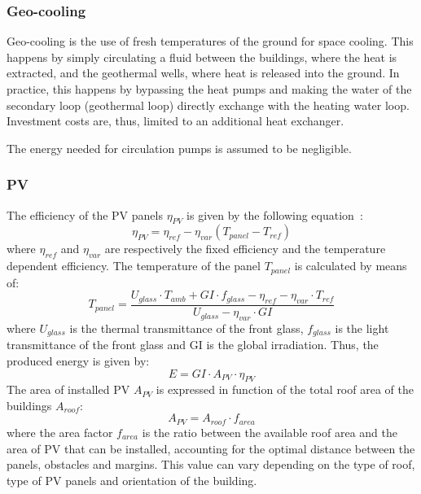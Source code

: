 \documentclass{article}
\begin{document}
\subsubsection{Geo-cooling}
Geo-cooling is the use of fresh temperatures of the ground for space cooling. This happens by simply circulating a fluid between the buildings, where the heat is extracted, and the geothermal wells, where heat is released into the ground. In practice, this happens by bypassing the heat pumps and making the water of the secondary loop (geothermal loop) directly exchange with the heating water loop. Investment costs are, thus, limited to an additional heat exchanger. 

The energy needed for circulation pumps is assumed to be negligible. 


\subsubsection{PV}\label{sss:pv}
The efficiency of the PV panels $\eta_{PV}$ is given by the following equation~\cite{stadlerModelbasedOptimizationDistributed2016}:
\begin{equation}
	\eta_{PV} = \eta_{ref} - \eta_{var} (T_{panel}-T_{ref})
\end{equation}
where $\eta_{ref}$ and $\eta_{var}$ are respectively the fixed efficiency and the temperature dependent efficiency. The temperature of the panel $T_{panel}$ is calculated by means of:
\begin{equation}
	T_{panel} = \frac{U_{glass}\cdot T_{amb} + GI \cdot f_{glass}-\eta_{ref} - \eta_{var} \cdot T_{ref}}{U_{glass}-\eta_{var} \cdot GI}
\end{equation}
where $U_{glass}$ is the thermal transmittance of the front glass, $f_{glass}$ is the light transmittance of the front glass and GI is the global irradiation.
Thus, the produced energy is given by:
\begin{equation}
	E = GI \cdot A_{PV} \cdot  \eta_{PV}
\end{equation}
The area of installed PV $A_{PV}$ is expressed in function of the total roof area of the buildings $A_{roof}$:
\begin{equation}
	A_{PV} = A_{roof} \cdot f_{area}
\end{equation}
where the area factor $f_{area}$ is the ratio between the available roof area and the area of PV that can be installed, accounting for the optimal distance between the panels, obstacles and margins. This value can vary depending on the type of roof, type of PV panels and orientation of the building.
\end{document}
